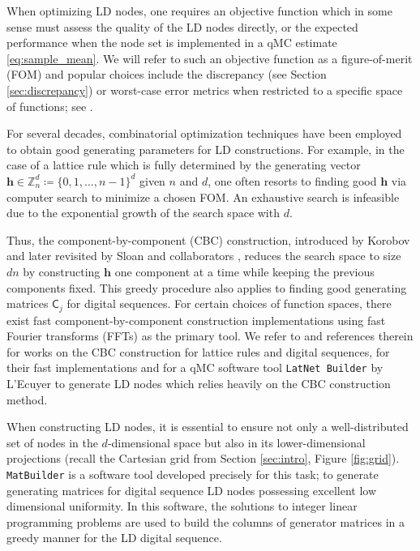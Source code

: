 \documentclass{svproc}
\begin{document}
When optimizing LD nodes, one requires an objective function which in some sense must assess the quality of the LD nodes directly, or the expected performance when the node set is implemented in a qMC estimate \eqref{eq:sample_mean}.  We will refer to such an objective function as a figure-of-merit (FOM) and popular choices include the discrepancy (see Section \ref{sec:discrepancy}) or worst-case error metrics when restricted to a specific space of functions; see \cite{Hic00a,LatNet}.


For several decades, combinatorial optimization techniques have been employed to obtain good generating parameters for LD constructions. For example, in the case of a lattice rule which is fully determined by the generating vector \(\boldsymbol{h} \in \mathbb{Z}_n^d \coloneqq \{0, 1, \ldots, n-1\}^d\) given $n$ and $d$,
one often resorts to finding good $\boldsymbol{h}$ via computer search to minimize a chosen FOM. An exhaustive search is infeasible due to the exponential growth of the search space with \(d\). 

Thus, the component-by-component (CBC) construction, introduced by Korobov \cite{kor63} and later revisited by Sloan and collaborators \cite{Slo02}, reduces the search space to size \(dn\) by constructing \(\boldsymbol{h}\) one component at a time while keeping the previous components fixed. This greedy procedure also applies to finding good generating matrices $\mathsf{C}_j$ for digital sequences.
For certain choices of function spaces, there exist fast component-by-component construction implementations using fast Fourier transforms (FFTs) as the primary tool. We refer to \cite{DicKuo04a,JoeKuo03,KuoJoe02b,DicEtal22a} and references therein for works on the CBC construction for lattice rules and digital sequences, \cite{NuyCoo06a,NuyCoo06b} for their fast implementations and \cite{LEcEtal22a,LatNet} for a qMC software tool \texttt{LatNet Builder} by L'Ecuyer to generate LD nodes which relies heavily on the CBC construction method.


When constructing LD nodes, it is essential to ensure not only a well-distributed set of nodes in the $d$-dimensional space but also in its lower-dimensional projections (recall the Cartesian grid from Section \ref{sec:intro}, Figure \ref{fig:grid}). \texttt{MatBuilder} \cite{paulin2022} is a software tool developed precisely for this task; to generate generating matrices for digital sequence LD nodes possessing excellent low dimensional uniformity. In this software, the solutions to integer linear programming problems are used to build the columns of generator matrices in a greedy manner for the LD digital sequence.
\end{document}
